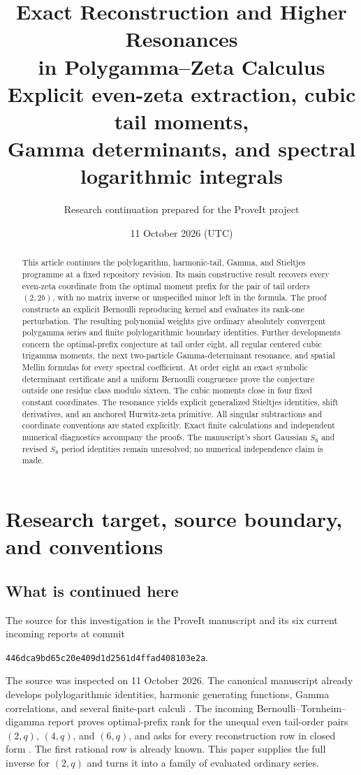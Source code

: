 \documentclass[11pt,letterpaper]{article}
\title{\color{ink}\textbf{Exact Reconstruction and Higher Resonances\\in Polygamma--Zeta Calculus}\\[.6em]
\large Explicit even-zeta extraction, cubic tail moments,\\Gamma determinants, and spectral logarithmic integrals}
\author{Research continuation prepared for the ProveIt project}
\date{11 October 2026 (UTC)}
\theoremstyle{definition}
\theoremstyle{remark}
\newcommand{\repoSHA}{\texttt{446dca9bd65c20e409d1d2561d4ffad408103e2a}}
\numberwithin{equation}{section}
\begin{document}
\maketitle
\begin{abstract}
This article continues the polylogarithm, harmonic-tail, Gamma, and
Stieltjes programme at a fixed repository revision. Its main constructive
result recovers every even-zeta coordinate from the optimal moment prefix
for the pair of tail orders $(2,2b)$, with no matrix inverse or unspecified
minor left in the formula. The proof constructs an explicit Bernoulli
reproducing kernel and evaluates its rank-one perturbation. The resulting
polynomial weights give ordinary absolutely convergent polygamma series
and finite polylogarithmic boundary identities. Further developments concern
the optimal-prefix conjecture at tail order eight, all regular centered
cubic trigamma moments, the next two-particle Gamma-determinant
resonance, and spatial Mellin formulas for every spectral coefficient.
At order eight an exact symbolic determinant certificate and a uniform
Bernoulli congruence prove the conjecture outside one residue class
modulo sixteen. The cubic moments close in four fixed constant
coordinates. The resonance yields explicit generalized Stieltjes
identities, shift derivatives, and an anchored Hurwitz-zeta primitive.
All singular subtractions and coordinate conventions are stated explicitly.
Exact finite calculations and independent numerical diagnostics accompany
the proofs. The manuscript's short Gaussian $S_6$ and revised $S_8$ period
identities remain unresolved; no numerical independence claim is made.
\end{abstract}
\tableofcontents
\newpage

\section{Research target, source boundary, and conventions}
\label{sec:scope}

\subsection{What is continued here}

The source for this investigation is the ProveIt manuscript and its six
current incoming reports at commit
\begin{center}\small\repoSHA.\end{center}
The source was inspected on 11 October 2026. The canonical manuscript
already develops polylogarithmic identities, harmonic generating
functions, Gamma correlations, and several finite-part calculi
\cite{repo}. The incoming Bernoulli--Tornheim--digamma report proves
optimal-prefix rank for the unequal even tail-order pairs $(2,q)$,
$(4,q)$, and $(6,q)$, and asks for every reconstruction row in closed
form \cite[research question R2]{incoming-bernoulli}. The first rational
row is already known. This paper supplies the full inverse for $(2,q)$
and turns it into a family of evaluated ordinary series.
\end{document}
